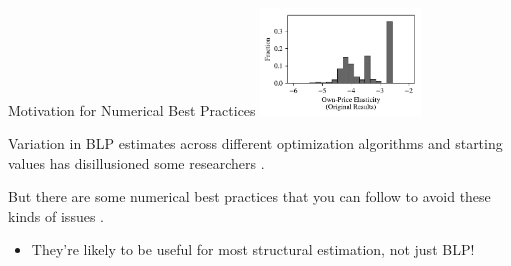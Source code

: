 \documentclass[aspectratio=169,t,11pt,table]{beamer}
\begin{document}
\begin{frame}{Motivation for Numerical Best Practices}
    \includegraphics[width=0.32\textwidth]{includes/elasticity_histogram_1.pdf}
    \begin{wideitemize}
        \item Variation in BLP estimates across different optimization algorithms and starting values has disillusioned some researchers \citep{knittel2014estimation}.
        \pause
        \item But there are some numerical best practices that you can follow to avoid these kinds of issues \citep{conlon2020best}.
        \begin{itemize}
            \item They're likely to be useful for most structural estimation, not just BLP!
        \end{itemize}
    \end{wideitemize}
\end{frame}
\end{document}
